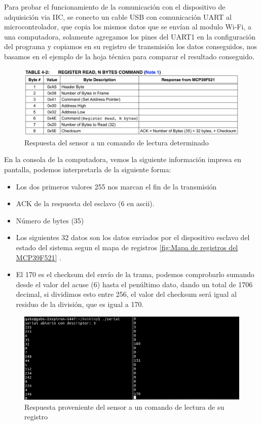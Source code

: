 Para probar el funcionamiento de la comunicación con el dispositivo de adquisición via IIC, se conecto un cable USB con comunicación UART al microcontrolador, que copia los mismos datos que se envían al modulo Wi-Fi, a una computadora, solamente agregamos los pines del UART1 en la configuración del programa y copiamos en su registro de transmisión los datos conseguidos, nos basamos en el ejemplo de la hoja técnica para comparar el resultado conseguido.

\begin{figure}[H]
	\centering
	\includegraphics[scale=.3]{Capitulo5/images/respuesta_sensor.png}
	\caption{Respuesta del sensor a un comando de lectura determinado}
	\label{fig:respuesta sensor}
\end{figure} 

En la consola de la computadora, vemos la siguiente información impresa en pantalla,  podemos interpretarla de la siguiente forma:

\begin{itemize}
    \item Los dos primeros valores 255 nos marcan el fin de la transmisión
    \item ACK de la respuesta del esclavo (6 en ascii).
    \item Número de bytes (35)
    \item Los siguientes 32 datos son los datos enviados por el dispositivo esclavo del estado del sistema segun el mapa de registros \ref{fig:Mapa de registros del MCP39F521} .
    \item El 170 es el checksum del envío de la trama, podemos comprobarlo sumando desde el valor del acuse (6) hasta el penúltimo dato, dando un total de 1706 decimal, si dividimos esto entre 256, el valor del checksum será igual al residuo de la división, que es igual a 170.
\end{itemize}

\begin{figure}[H]
	\centering
	\includegraphics[scale=.3]{Capitulo5/images/consola.png}
	\caption{Respuesta proveniente del sensor a un comando de lectura de su registro}
	\label{fig:consola}
\end{figure} 

